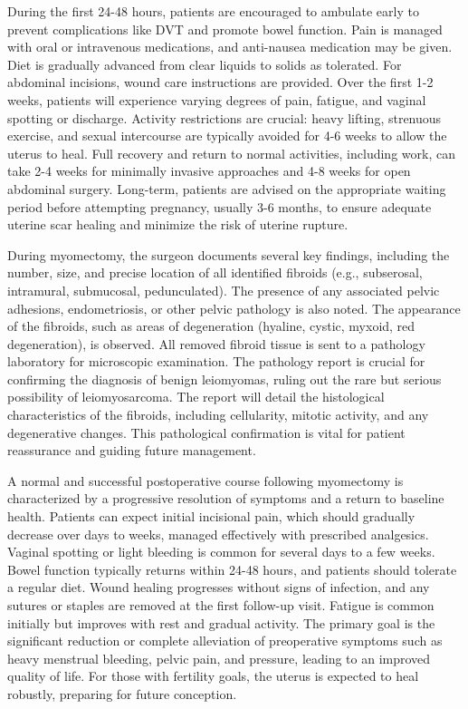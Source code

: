 During the first 24-48 hours, patients are encouraged to ambulate early to prevent complications like DVT and promote bowel function. Pain is managed with oral or intravenous medications, and anti-nausea medication may be given. Diet is gradually advanced from clear liquids to solids as tolerated. For abdominal incisions, wound care instructions are provided. Over the first 1-2 weeks, patients will experience varying degrees of pain, fatigue, and vaginal spotting or discharge. Activity restrictions are crucial: heavy lifting, strenuous exercise, and sexual intercourse are typically avoided for 4-6 weeks to allow the uterus to heal. Full recovery and return to normal activities, including work, can take 2-4 weeks for minimally invasive approaches and 4-8 weeks for open abdominal surgery. Long-term, patients are advised on the appropriate waiting period before attempting pregnancy, usually 3-6 months, to ensure adequate uterine scar healing and minimize the risk of uterine rupture.

During myomectomy, the surgeon documents several key findings, including the number, size, and precise location of all identified fibroids (e.g., subserosal, intramural, submucosal, pedunculated). The presence of any associated pelvic adhesions, endometriosis, or other pelvic pathology is also noted. The appearance of the fibroids, such as areas of degeneration (hyaline, cystic, myxoid, red degeneration), is observed. All removed fibroid tissue is sent to a pathology laboratory for microscopic examination. The pathology report is crucial for confirming the diagnosis of benign leiomyomas, ruling out the rare but serious possibility of leiomyosarcoma. The report will detail the histological characteristics of the fibroids, including cellularity, mitotic activity, and any degenerative changes. This pathological confirmation is vital for patient reassurance and guiding future management.

A normal and successful postoperative course following myomectomy is characterized by a progressive resolution of symptoms and a return to baseline health. Patients can expect initial incisional pain, which should gradually decrease over days to weeks, managed effectively with prescribed analgesics. Vaginal spotting or light bleeding is common for several days to a few weeks. Bowel function typically returns within 24-48 hours, and patients should tolerate a regular diet. Wound healing progresses without signs of infection, and any sutures or staples are removed at the first follow-up visit. Fatigue is common initially but improves with rest and gradual activity. The primary goal is the significant reduction or complete alleviation of preoperative symptoms such as heavy menstrual bleeding, pelvic pain, and pressure, leading to an improved quality of life. For those with fertility goals, the uterus is expected to heal robustly, preparing for future conception.

